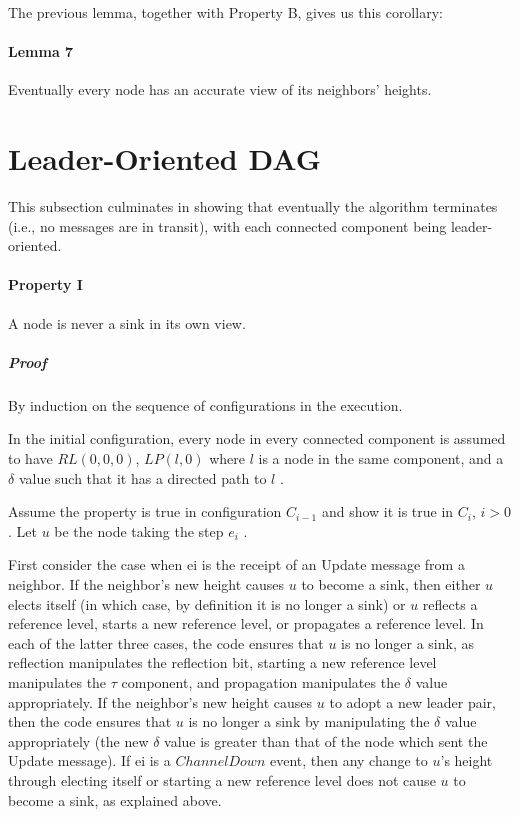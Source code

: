 The previous lemma, together with Property B, gives us this corollary:

\paragraph{Lemma 7}Eventually every node has an accurate view of its neighbors’ heights.
\section{Leader-Oriented DAG}
This subsection culminates in showing that eventually the algorithm terminates (i.e., no messages are in transit), with each connected component being leader-oriented.

\paragraph{Property I} A node is never a sink in its own view.
\subparagraph{Proof}By induction on the sequence of configurations in the execution.

In the initial configuration, every node in every connected component is assumed to have $RL(0,0,0)$, $LP (l, 0)$ where $l$ is a node in the same component, and a $\delta$ value such that it has a directed path to $l$	.

Assume the property is true in configuration $C_{i-1}$ and show it is true in $C_i$, $i > 0$. Let $u$ be the node taking the step $e_i$ .

First consider the case when ei is the receipt of an Update message from a neighbor. If the neighbor’s new height causes $u$ to become a sink, then either $u$ elects itself (in which case, by definition it is no longer a sink) or $u$ reflects a reference level, starts a new reference level, or propagates a reference level. In each of the latter three cases, the code ensures that $u$ is no longer a sink, as reflection manipulates the reflection bit, starting a new reference level manipulates the $\tau$ component, and propagation manipulates the $\delta$ value appropriately. If the neighbor’s new height causes $u$ to adopt a new leader pair, then the code ensures that $u$ is no longer a sink by manipulating the $\delta$ value appropriately (the new $\delta$ value is greater than that of the node which sent the Update message). If ei is a $ChannelDown$ event, then any change to $u$’s height through electing itself or starting a new reference level does not cause $u$ to become a sink, as explained above.

